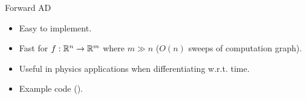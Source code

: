 \begin{frame}{Forward AD}
\begin{itemize}
    \item Easy to implement.
    \item Fast for $f:\mathbb{R}^n \to \mathbb{R}^m$ where $m \gg n$ ($O(n)$ sweeps of computation graph).
    \item Useful in physics applications when differentiating w.r.t. time.
    \item Example code ().
\end{itemize}
\end{frame}